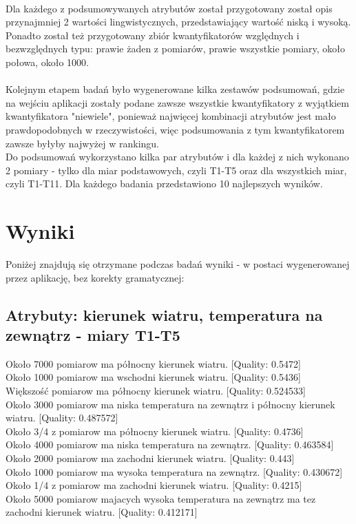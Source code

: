 \documentclass{classrep}
\begin{document}
\paragraph{}
Dla każdego z podsumowywanych atrybutów został przygotowany został opis przynajmniej 2 wartości lingwistycznych, przedstawiający wartość niską i wysoką. Ponadto został też przygotowany zbiór kwantyfikatorów względnych i bezwzględnych typu: prawie żaden z pomiarów, prawie wszystkie pomiary, około połowa, około 1000.

\paragraph{}
Kolejnym etapem badań było wygenerowane kilka zestawów podsumowań, gdzie na wejściu aplikacji zostały podane zawsze wszystkie kwantyfikatory z wyjątkiem kwantyfikatora "niewiele", ponieważ najwięcej kombinacji atrybutów jest mało prawdopodobnych w rzeczywistości, więc podsumowania z tym kwantyfikatorem zawsze byłyby najwyżej w rankingu.\\
Do podsumowań wykorzystano kilka par atrybutów i dla każdej z nich wykonano 2 pomiary - tylko dla miar podstawowych, czyli T1-T5 oraz dla wszystkich miar, czyli T1-T11. Dla każdego badania przedstawiono 10 najlepszych wyników.

\section{Wyniki}
Poniżej znajdują się otrzymane podczas badań wyniki - w postaci wygenerowanej przez aplikację, bez korekty gramatycznej:

\subsection{Atrybuty: kierunek wiatru, temperatura na zewnątrz - miary T1-T5}

Około 7000 pomiarow ma północny kierunek wiatru. [Quality: 0.5472]\\
Około 1000 pomiarow ma wschodni kierunek wiatru. [Quality: 0.5436]\\
Większość pomiarow ma północny kierunek wiatru. [Quality: 0.524533]\\
Około 3000 pomiarow ma niska temperatura na zewnątrz i północny kierunek wiatru. [Quality: 0.487572]\\
Około 3/4 z pomiarow ma północny kierunek wiatru. [Quality: 0.4736]\\
Około 4000 pomiarow ma niska temperatura na zewnątrz. [Quality: 0.463584]\\
Około 2000 pomiarow ma zachodni kierunek wiatru. [Quality: 0.443]\\
Około 1000 pomiarow ma wysoka temperatura na zewnątrz. [Quality: 0.430672]\\
Około 1/4 z pomiarow ma zachodni kierunek wiatru. [Quality: 0.4215]\\
Około 5000 pomiarow majacych wysoka temperatura na zewnątrz ma tez zachodni kierunek wiatru. [Quality: 0.412171]\\
\end{document}
